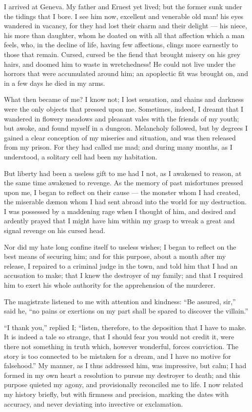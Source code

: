 I arrived at Geneva. My father and
Ernest yet lived; but the former sunk
under the tidings that I bore. I see
him now, excellent and venerable old
man! his eyes wandered in vacancy, for
they had lost their charm and their delight --- his
niece, his more than daughter,
whom he doated on with all that affection
which a man feels, who, in the decline
of life, having few affections, clings
more earnestly to those that remain.
Cursed, cursed be the fiend that brought
misery on his grey hairs, and doomed
him to waste in wretchedness! He
could not live under the horrors that
were accumulated around him; an
apoplectic fit was brought on, and in
a few days he died in my arms.

What then became of me? I know
not; I lost sensation, and chains and
darkness were the only objects that
pressed upon me. Sometimes, indeed,
I dreamt that I wandered in flowery
meadows and pleasant vales with the
friends of my youth; but awoke, and
found myself in a dungeon. Melancholy
followed, but by degrees I gained
a clear conception of my miseries and
situation, and was then released from
my prison. For they had called me
mad; and during many months, as I
understood, a solitary cell had been my
habitation.

But liberty had been a useless gift
to me had I not, as I awakened to reason,
at the same time awakened to revenge.
As the memory of past misfortunes
pressed upon me, I began to
reflect on their cause --- the monster
whom I had created, the miserable dæmon
whom I had sent abroad into the
world for my destruction. I was possessed
by a maddening rage when I
thought of him, and desired and ardently
prayed that I might have him
within my grasp to wreak a great and
signal revenge on his cursed head.

Nor did my hate long confine itself
to useless wishes; I began to reflect on
the best means of securing him; and
for this purpose, about a month after
my release, I repaired to a criminal
judge in the town, and told him that I
had an accusation to make; that I knew
the destroyer of my family; and that
I required him to exert his whole authority
for the apprehension of the
murderer.

The magistrate listened to me with
attention and kindness: ``Be assured,
sir,'' said he, ``no pains or exertions
on my part shall be spared to discover
the villain.''

``I thank you,'' replied I; ``listen,
therefore, to the deposition that I have
to make. It is indeed a tale so strange,
that I should fear you would not credit
it, were there not something in truth
which, however wonderful, forces conviction.
The story is too connected to
be mistaken for a dream, and I have no
motive for falsehood.'' My manner, as
I thus addressed him, was impressive,
but calm; I had formed in my own
heart a resolution to pursue my destroyer
to death; and this purpose
quieted my agony, and provisionally
reconciled me to life. I now related
my history briefly, but with firmness
and precision, marking the dates with
accuracy, and never deviating into invective
or exclamation.

